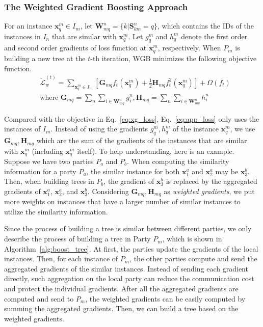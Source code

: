 \documentclass[letterpaper]{article} %
\theoremstyle{definition}
\newcommand{\mtx}[1]{\ensuremath{\mathbf{#1}}}
\begin{document}
\subsubsection{The Weighted Gradient Boosting Approach} 
For an instance $\mathbf{x}_q^m\in I_m$, let $\mathbf{W}_{mq}^n=\{k|\mtx{S}_{km}^n=q\}$, which contains the IDs of the instances in $I_n$ that are similar with $\mathbf{x}_q^m$. Let $g_q^m$ and $h_q^m$ denote the first order and second order gradients of loss function at $\mathbf{x}_q^m$, respectively. When $P_m$ is building a new tree at the $t$-th iteration, WGB minimizes the following objective function. 
\begin{equation}
\begin{aligned}
    &\mathcal{\tilde{L}}_w^{(t)} = \sum_{\mathbf{x}_q^m\in I_m} [\mathbf{G}_{mq}f_t(\mathbf{x}_q^m)+\frac{1}{2}\mathbf{H}_{mq}f_t^2(\mathbf{x}_q^m)]+\Omega(f_t)\\
    &\text{where } \mathbf{G}_{mq} = \sum_{n}\sum_{i\in \mathbf{W}_{mq}^n}g_i^n, \mathbf{H}_{mq} = \sum_{n}\sum_{i\in \mathbf{W}_{mq}^n}h_i^n
\label{eq:app_loss}
\end{aligned}
\end{equation}

Compared with the objective in Eq.~\eqref{eq:xg_loss}, Eq.~\eqref{eq:app_loss} only uses the instances of $I_m$. Instead of using the gradients $g_q^m, h_q^m$ of the instance $\mathbf{x}_q^m$,  we use $\mathbf{G}_{mq}, \mathbf{H}_{mq}$ which are the sum of the gradients of the instances that are similar with $\mathbf{x}_q^m$ (including $\mathbf{x}_q^m$ itself). To help understanding, here is an example. Suppose we have two parties $P_a$ and $P_b$. When computing the similarity information for a party $P_a$, the similar instance for both $\mathbf{x}_1^a$ and $\mathbf{x}_2^a$ may be $\mathbf{x}_3^b$. Then, when building trees in $P_b$, the gradient of $\mathbf{x}_3^b$ is replaced by the aggregated gradients of $\mathbf{x}_1^a$, $\mathbf{x}_2^a$, and $\mathbf{x}_3^b$. Considering $\mathbf{G}_{mq}, \mathbf{H}_{mq}$ as \textit{weighted gradients}, we put more weights on instances that have a larger number of similar instances to utilize the similarity information.

Since the process of building a tree is similar between different parties, we only describe the process of building a tree in Party $P_m$, which is shown in Algorithm~\ref{alg:boost_tree}. At first, the parties update the gradients of the local instances. Then, for each instance of $P_m$, the other parties compute and send the aggregated gradients of the similar instances. Instead of sending each gradient directly, such aggregation on the local party can reduce the communication cost and protect the individual gradients. After all the aggregated gradients are computed and send to $P_m$, the weighted gradients can be easily computed by summing the aggregated gradients. Then, we can build a tree based on the weighted gradients.
\end{document}
